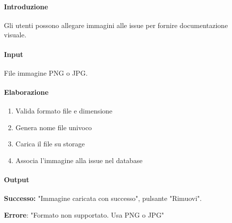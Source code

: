 \newpage


\begin{reqbox}[title=REQ-FUN-14: Aggiungi Immagine]
\label{subsubsec:req-aggiungi-immagine}

\paragraph{Introduzione}
Gli utenti possono allegare immagini alle issue per fornire documentazione visuale.

\paragraph{Input}
File immagine PNG o JPG.

\paragraph{Elaborazione}
\begin{enumerate}[leftmargin=1.1em]
\item Valida formato file e dimensione
\item Genera nome file univoco
\item Carica il file su storage
\item Associa l'immagine alla issue nel database
\end{enumerate}

\paragraph{Output}
\textbf{Successo: } "Immagine caricata con successo", pulsante "Rimuovi".

\textbf{Errore}: "Formato non supportato. Usa PNG o JPG"

\end{reqbox}

\vspace{0.5cm}

\newpage


